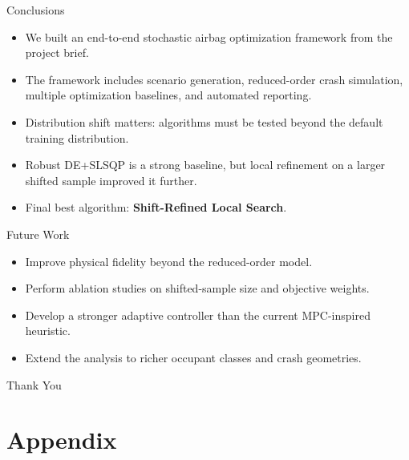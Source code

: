 \documentclass[aspectratio=169]{beamer}
\begin{document}
\begin{frame}{Conclusions}
  \begin{itemize}
    \item We built an end-to-end stochastic airbag optimization framework from the project brief.
    \item The framework includes scenario generation, reduced-order crash simulation, multiple optimization baselines, and automated reporting.
    \item Distribution shift matters: algorithms must be tested beyond the default training distribution.
    \item Robust DE+SLSQP is a strong baseline, but local refinement on a larger shifted sample improved it further.
    \item Final best algorithm: \textbf{Shift-Refined Local Search}.
  \end{itemize}
\end{frame}

\begin{frame}{Future Work}
  \begin{itemize}
    \item Improve physical fidelity beyond the reduced-order model.
    \item Perform ablation studies on shifted-sample size and objective weights.
    \item Develop a stronger adaptive controller than the current MPC-inspired heuristic.
    \item Extend the analysis to richer occupant classes and crash geometries.
  \end{itemize}
\end{frame}

\begin{frame}
  \centering
  \Huge Thank You
\end{frame}

\section{Appendix}
\end{document}
